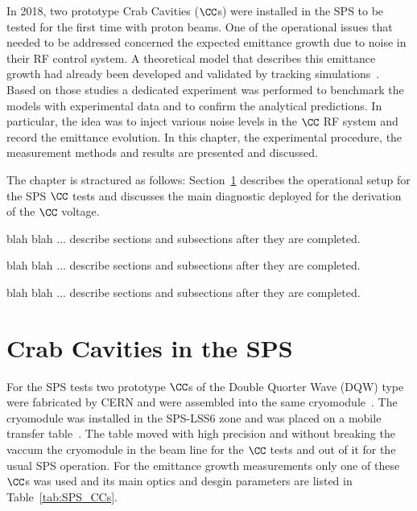 \vspace*{1mm}
In 2018, two prototype Crab Cavities ($\CC$s) were installed in the SPS to be tested for the first time with proton beams. One of the operational issues that needed to be addressed concerned the expected emittance growth due to noise in their RF control system. A theoretical model that describes this emittance growth had already been developed and validated by tracking simulations~\cite{PhysRevSTAB.18.101001}. Based on those studies a dedicated experiment was performed to benchmark the models with experimental data and to confirm the analytical predictions. In particular, the idea was to inject various noise levels in the $\CC$ RF system and record the emittance evolution. In this chapter, the experimental procedure, the measurement methods and results are presented and discussed.
 
The chapter is stractured as follows: Section~\ref{sec:CC_SPS_setup} describes the operational setup for the SPS $\CC$ tests and discusses the main diagnostic deployed for the derivation of the $\CC$ voltage.

blah blah ... describe sections and subsections after they are completed.

blah blah ... describe sections and subsections after they are completed.

blah blah ... describe sections and subsections after they are completed.

\section{Crab Cavities in the SPS}\label{sec:CC_SPS_setup}

For the SPS tests two prototype $\CC$s of the Double Quorter Wave (DQW) type were fabricated by CERN and were assembled into the same cryomodule~\cite{Zanoni:2017}. The cryomodule was installed in the SPS-LSS6 zone and was placed on a mobile transfer table~\cite{Garlaschè:2648553}. The table moved with high precision and without breaking the vaccum the cryomodule in the beam line for the $\CC$ tests and out of it for the usual SPS operation. For the emittance growth measurements only one of these $\CC$s was used and its main optics and desgin parameters are listed in Table~\ref{tab:SPS_CCs}. 

